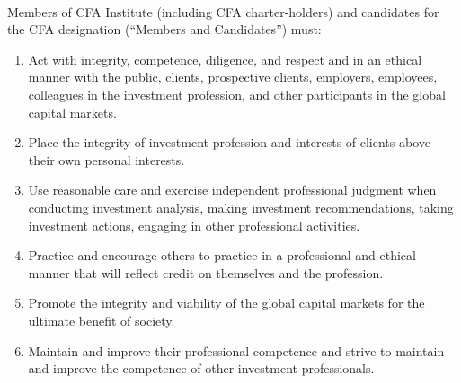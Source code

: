 \begin{definition} \\
Members of CFA Institute (including CFA charter-holders) and candidates for the CFA designation (“Members and Candidates”) must:
\begin{enumerate}[label=\roman*.]
\setlength{\itemsep}{0pt}
\item Act with integrity, competence, diligence, and respect and in an ethical manner with the public, clients, prospective clients, employers, employees, colleagues in the investment profession, and other participants in the global capital markets.
\item Place the integrity of investment profession and interests of clients above their own personal interests.
\item Use reasonable care and exercise independent professional judgment when conducting investment analysis, making investment recommendations, taking investment actions, engaging in other professional activities.
\item Practice and encourage others to practice in a professional and ethical manner that will reflect credit on themselves and the profession.
\item Promote the integrity and viability of the global capital markets for the ultimate benefit of society.
\item Maintain and improve their professional competence and strive to maintain and improve the competence of other investment professionals.
\end{enumerate}
\end{definition}